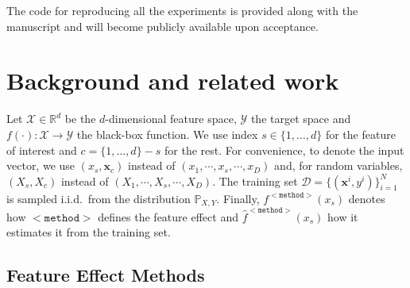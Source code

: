 \documentclass{ecai}  %
\newcommand{\xc}{\mathbf{x}_c}
\newcommand{\xb}{\mathbf{x}}
\begin{document}
The code for reproducing all the
experiments is provided along with the manuscript and will become
publicly available upon acceptance.

\section{Background and related work}
\label{sec:background}

Let \(\mathcal{X} \in \mathbb{R}^d\) be the \(d\)-dimensional feature
space, \(\mathcal{Y}\) the target space and
\(f(\cdot) : \mathcal{X} \rightarrow \mathcal{Y}\) the black-box
function.  We use index \(s \in \{1, \ldots, d\}\) for the feature of
interest and \(c = \{1, \ldots, d\} - s\) for the rest.  For
convenience, to denote the input vector, we use \((x_s, \xc)\) instead
of \((x_1, \cdots , x_s, \cdots, x_D)\) and, for random variables,
\((X_s, X_c)\) instead of \((X_1, \cdots , X_s, \cdots, X_D)\).  The
training set \(\mathcal{D} = \{(\xb^i, y^i)\}_{i=1}^N\) is sampled
i.i.d.\ from the distribution \(\mathbb{P}_{X,Y}\).  Finally,
\(f^{\mathtt{<method>}}(x_s)\) denotes how \(\mathtt{<method>}\)
defines the feature effect and \(\hat{f}^{\mathtt{<method>}}(x_s)\)
how it estimates it from the training set.

\subsection{Feature Effect Methods}
\label{subsec:feat-effect-meth}
\end{document}
